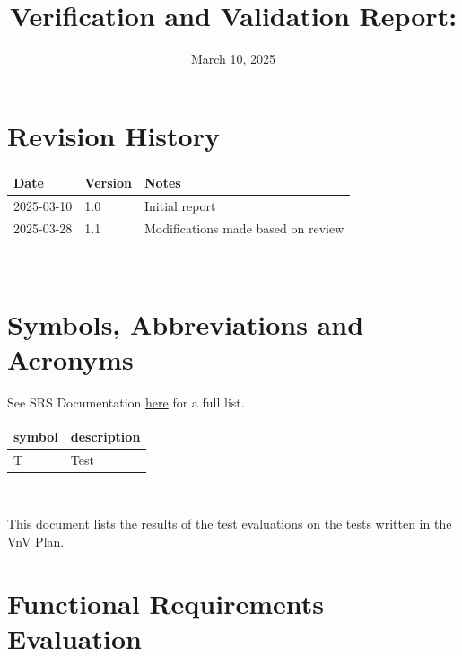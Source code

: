\documentclass[12pt, titlepage]{article}
\begin{document}
\title{Verification and Validation Report: \progname}
\author{\authname}
\date{March 10, 2025}

\maketitle


\section{Revision History}

\begin{tabularx}{\textwidth}{p{3cm}p{2cm}X}
  \toprule {\bf Date} & {\bf Version} & {\bf Notes} \\
  \midrule
  2025-03-10              & 1.0           & Initial report\\
  2025-03-28              & 1.1           & Modifications made based on review \\
  \bottomrule
\end{tabularx}

~\newpage

\section{Symbols, Abbreviations and Acronyms}

See SRS Documentation \href{https://github.com/russellrd/realm/blob/main/docs/SRS-IEEE/SRS.pdf}{here} for a full list.\\

\renewcommand{\arraystretch}{1.2}
\begin{tabular}{l l}
  \toprule
  \textbf{symbol} & \textbf{description} \\
  \midrule
  T               & Test                 \\
  \bottomrule
\end{tabular}\\

\newpage

\tableofcontents

\listoftables %

\listoffigures %

\newpage


This document lists the results of the test evaluations on the tests written in the VnV Plan.

\section{Functional Requirements Evaluation}
\end{document}
